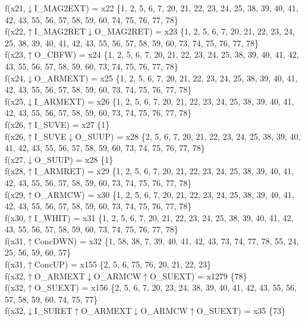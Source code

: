 f(x21,$\downarrow$I\_MAG2EXT) = x22 \{1, 2, 5, 6, 7, 20, 21, 22, 23, 24, 25, 38, 39, 40, 41, 42, 43, 55, 56, 57, 58, 59, 60, 74, 75, 76, 77, 78\} \\  
f(x22,$\uparrow$I\_MAG2RET$\downarrow$O\_MAG2RET) = x23 \{1, 2, 5, 6, 7, 20, 21, 22, 23, 24, 25, 38, 39, 40, 41, 42, 43, 55, 56, 57, 58, 59, 60, 73, 74, 75, 76, 77, 78\} \\  
f(x23,$\uparrow$O\_CBFW) = x24 \{1, 2, 5, 6, 7, 20, 21, 22, 23, 24, 25, 38, 39, 40, 41, 42, 43, 55, 56, 57, 58, 59, 60, 73, 74, 75, 76, 77, 78\} \\  
f(x24,$\downarrow$O\_ARMEXT) = x25 \{1, 2, 5, 6, 7, 20, 21, 22, 23, 24, 25, 38, 39, 40, 41, 42, 43, 55, 56, 57, 58, 59, 60, 73, 74, 75, 76, 77, 78\} \\  
f(x25,$\downarrow$I\_ARMEXT) = x26 \{1, 2, 5, 6, 7, 20, 21, 22, 23, 24, 25, 38, 39, 40, 41, 42, 43, 55, 56, 57, 58, 59, 60, 73, 74, 75, 76, 77, 78\} \\  
f(x26,$\uparrow$I\_SUVE) = x27 \{1\} \\  
f(x26,$\uparrow$I\_SUVE$\downarrow$O\_SUUP) = x28 \{2, 5, 6, 7, 20, 21, 22, 23, 24, 25, 38, 39, 40, 41, 42, 43, 55, 56, 57, 58, 59, 60, 73, 74, 75, 76, 77, 78\} \\  
f(x27,$\downarrow$O\_SUUP) = x28 \{1\} \\  
f(x28,$\uparrow$I\_ARMRET) = x29 \{1, 2, 5, 6, 7, 20, 21, 22, 23, 24, 25, 38, 39, 40, 41, 42, 43, 55, 56, 57, 58, 59, 60, 73, 74, 75, 76, 77, 78\} \\  
f(x29,$\uparrow$O\_ARMCW) = x30 \{1, 2, 5, 6, 7, 20, 21, 22, 23, 24, 25, 38, 39, 40, 41, 42, 43, 55, 56, 57, 58, 59, 60, 73, 74, 75, 76, 77, 78\} \\  
f(x30,$\uparrow$I\_WHIT) = x31 \{1, 2, 5, 6, 7, 20, 21, 22, 23, 24, 25, 38, 39, 40, 41, 42, 43, 55, 56, 57, 58, 59, 60, 73, 74, 75, 76, 77, 78\} \\  
f(x31,$\uparrow$ConcDWN) = x32 \{1, 58, 38, 7, 39, 40, 41, 42, 43, 73, 74, 77, 78, 55, 24, 25, 56, 59, 60, 57\} \\  
f(x31,$\uparrow$ConcUP) = x155 \{2, 5, 6, 75, 76, 20, 21, 22, 23\} \\  
f(x32,$\uparrow$O\_ARMEXT$\downarrow$O\_ARMCW$\uparrow$O\_SUEXT) = x1279 \{78\} \\  
f(x32,$\uparrow$O\_SUEXT) = x156 \{2, 5, 6, 7, 20, 23, 24, 38, 39, 40, 41, 42, 43, 55, 56, 57, 58, 59, 60, 74, 75, 77\} \\  
f(x32,$\downarrow$I\_SURET$\uparrow$O\_ARMEXT$\downarrow$O\_ARMCW$\uparrow$O\_SUEXT) = x35 \{73\} \\  

